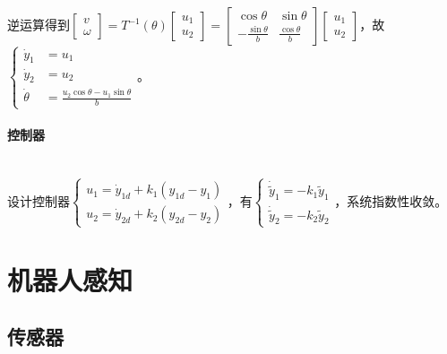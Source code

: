 \documentclass[
12pt, %
a4paper, 
oneside, %
headinclude,footinclude, %
]{scrartcl}
\begin{document}
逆运算得到$ \begin{bmatrix} v \\ \omega \end{bmatrix} = T^{-1}(\theta) \begin{bmatrix} u_1 \\ u_2 \end{bmatrix} = \begin{bmatrix} \cos\theta & \sin\theta \\ -\frac{\sin\theta}{b} & \frac{\cos\theta}{b} \end{bmatrix} \begin{bmatrix} u_1 \\ u_2 \end{bmatrix} $，故$ \begin{cases} \dot{y}_1 &= u_1 \\ \dot{y}_2 &= u_2 \\ \dot{\theta} &= \frac{u_2 \cos\theta - u_1 \sin\theta}{b} \end{cases} $。
\paragraph{控制器}~\\

设计控制器$ \begin{cases} u_1 = \dot{y}_{1d} + k_1(y_{1d} - y_1) \\ u_2 = \dot{y}_{2d} + k_2(y_{2d} - y_2) \end{cases} $，有$ \begin{cases} \dot{\tilde{y}}_1 = -k_1 \tilde{y}_1 \\ \dot{\tilde{y}}_2 = -k_2 \tilde{y}_2 \end{cases} $，系统指数性收敛。
\section{机器人感知}
\subsection[传感器]{传感器}
\end{document}
